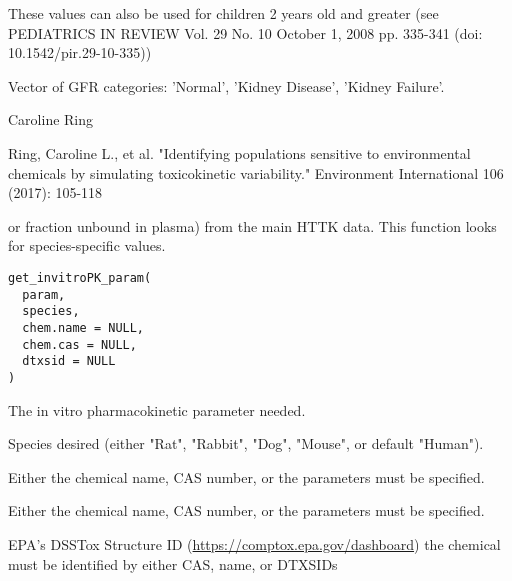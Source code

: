 \documentclass[a4paper]{book}
\begin{document}
%
\begin{Details}\relax
These values can also be used for children 2 years old and greater (see PEDIATRICS IN
REVIEW Vol. 29 No. 10 October 1, 2008 pp. 335-341 (doi:
10.1542/pir.29-10-335))
\end{Details}
%
\begin{Value}
Vector of GFR categories: 'Normal', 'Kidney Disease', 'Kidney
Failure'.
\end{Value}
%
\begin{Author}\relax
Caroline Ring
\end{Author}
%
\begin{References}\relax
Ring, Caroline L., et al. "Identifying populations sensitive to 
environmental chemicals by simulating toxicokinetic variability." Environment 
International 106 (2017): 105-118
\end{References}
%
\begin{Description}\relax
or fraction unbound in plasma) from the main HTTK data. This function looks
for species-specific values.
\end{Description}
%
\begin{Usage}
\begin{verbatim}
get_invitroPK_param(
  param,
  species,
  chem.name = NULL,
  chem.cas = NULL,
  dtxsid = NULL
)
\end{verbatim}
\end{Usage}
%
\begin{Arguments}
\begin{ldescription}
\item[\code{param}] The in vitro pharmacokinetic parameter needed.

\item[\code{species}] Species desired (either "Rat", "Rabbit", "Dog", "Mouse", or
default "Human").

\item[\code{chem.name}] Either the chemical name, CAS number, or the parameters
must be specified.

\item[\code{chem.cas}] Either the chemical name, CAS number, or the parameters must
be specified.

\item[\code{dtxsid}] EPA's DSSTox Structure ID (\url{https://comptox.epa.gov/dashboard})
the chemical must be identified by either CAS, name, or DTXSIDs
\end{ldescription}
\end{Arguments}
\end{document}
